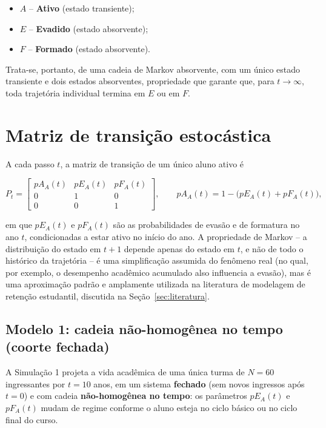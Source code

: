 \documentclass[12pt,times,article,chapter=TITLE]{abnt}
\begin{document}
\begin{itemize}
  \item $A$ -- \textbf{Ativo} (estado transiente);
  \item $E$ -- \textbf{Evadido} (estado absorvente);
  \item $F$ -- \textbf{Formado} (estado absorvente).
\end{itemize}

Trata-se, portanto, de uma cadeia de Markov absorvente, com um único estado transiente e dois estados absorventes, propriedade que garante que, para $t \to \infty$, toda trajetória individual termina em $E$ ou em $F$.

\section{Matriz de transição estocástica}

A cada passo $t$, a matriz de transição de um único aluno ativo é

\begin{equation}
P_t = \begin{bmatrix}
pA_A(t) & pE_A(t) & pF_A(t) \\
0 & 1 & 0 \\
0 & 0 & 1
\end{bmatrix}, \qquad
pA_A(t) = 1 - \big(pE_A(t) + pF_A(t)\big),
\end{equation}

em que $pE_A(t)$ e $pF_A(t)$ são as probabilidades de evasão e de formatura no ano $t$, condicionadas a estar ativo no início do ano. A propriedade de Markov -- a distribuição do estado em $t+1$ depende apenas do estado em $t$, e não de todo o histórico da trajetória -- é uma simplificação assumida do fenômeno real (no qual, por exemplo, o desempenho acadêmico acumulado also influencia a evasão), mas é uma aproximação padrão e amplamente utilizada na literatura de modelagem de retenção estudantil, discutida na Seção~\ref{sec:literatura}.

\subsection{Modelo 1: cadeia não-homogênea no tempo (coorte fechada)}

A Simulação 1 projeta a vida acadêmica de uma única turma de $N=60$ ingressantes por $t=10$ anos, em um sistema \textbf{fechado} (sem novos ingressos após $t=0$) e com cadeia \textbf{não-homogênea no tempo}: os parâmetros $pE_A(t)$ e $pF_A(t)$ mudam de regime conforme o aluno esteja no ciclo básico ou no ciclo final do curso.
\end{document}
